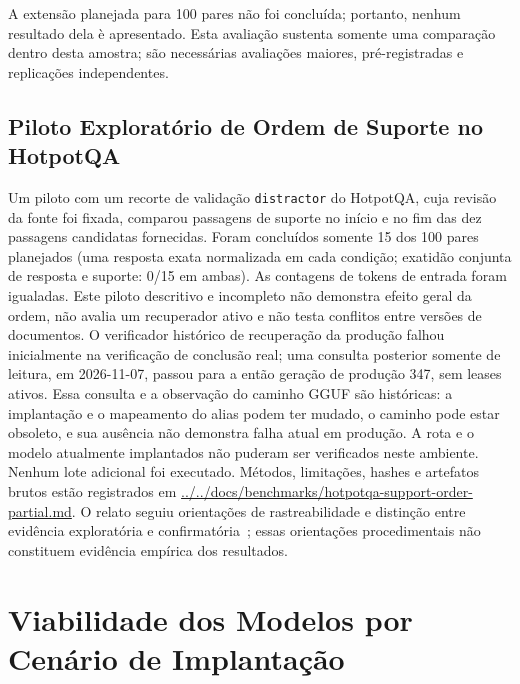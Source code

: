 \documentclass[10pt,a4paper,twocolumn]{article}
\begin{document}
A extens\~ao planejada para 100 pares n\~ao foi conclu\'ida; portanto, nenhum resultado dela \`e apresentado. Esta avalia\c{c}\~ao sustenta somente uma compara\c{c}\~ao dentro desta amostra; s\~ao necess\'arias avalia\c{c}\~oes maiores, pr\'e-registradas e replica\c{c}\~oes independentes.

\subsection{Piloto Explorat\'orio de Ordem de Suporte no HotpotQA}

Um piloto com um recorte de valida\c{c}\~ao \texttt{distractor} do HotpotQA, cuja revis\~ao da fonte foi fixada, comparou passagens de suporte no in\'icio e no fim das dez passagens candidatas fornecidas. Foram conclu\'idos somente 15 dos 100 pares planejados (uma resposta exata normalizada em cada condi\c{c}\~ao; exatid\~ao conjunta de resposta e suporte: 0/15 em ambas). As contagens de tokens de entrada foram igualadas. Este piloto descritivo e incompleto n\~ao demonstra efeito geral da ordem, n\~ao avalia um recuperador ativo e n\~ao testa conflitos entre vers\~oes de documentos. O verificador hist\'orico de recupera\c{c}\~ao da produ\c{c}\~ao falhou inicialmente na verifica\c{c}\~ao de conclus\~ao real; uma consulta posterior somente de leitura, em 2026-11-07, passou para a ent\~ao gera\c{c}\~ao de produ\c{c}\~ao 347, sem leases ativos. Essa consulta e a observa\c{c}\~ao do caminho GGUF s\~ao hist\'oricas: a implanta\c{c}\~ao e o mapeamento do alias podem ter mudado, o caminho pode estar obsoleto, e sua aus\^encia n\~ao demonstra falha atual em produ\c{c}\~ao. A rota e o modelo atualmente implantados n\~ao puderam ser verificados neste ambiente. Nenhum lote adicional foi executado. M\'etodos, limita\c{c}\~oes, hashes e artefatos brutos est\~ao registrados em \url{../../docs/benchmarks/hotpotqa-support-order-partial.md}. O relato seguiu orienta\c{c}\~oes de rastreabilidade e distin\c{c}\~ao entre evid\^encia explorat\'oria e confirmat\'oria~\cite{kassis2026skills}; essas orienta\c{c}\~oes procedimentais n\~ao constituem evid\^encia emp\'irica dos resultados.

\section{Viabilidade dos Modelos por Cen\'ario de Implanta\c{c}\~ao}
\end{document}
